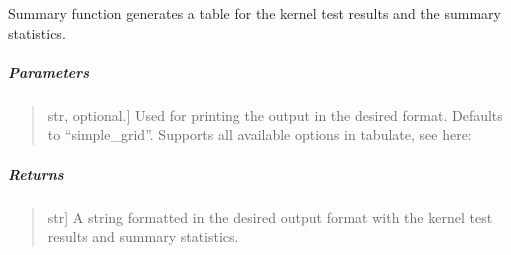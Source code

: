 \documentclass[letterpaper,10pt,english,openany,oneside]{sphinxmanual}
\begin{document}

\begin{fulllineitems}
\label{\detokenize{api_reference/generated/QuadratiK.kernel_test.KernelTest:QuadratiK.kernel_test.KernelTest.summary}}
\pysigstartsignatures
{}
\pysigstopsignatures
\sphinxAtStartPar
Summary function generates a table for the kernel test results and the summary statistics.


\subparagraph{Parameters}
\label{\detokenize{api_reference/generated/QuadratiK.kernel_test.KernelTest:id1}}\begin{quote}
\begin{description}
\sphinxlineitem{print\_fmt}{[}str, optional.{]}
\sphinxAtStartPar
Used for printing the output in the desired format. Defaults to “simple\_grid”.
Supports all available options in tabulate, see here: 

\end{description}
\end{quote}


\subparagraph{Returns}
\label{\detokenize{api_reference/generated/QuadratiK.kernel_test.KernelTest:id2}}\begin{quote}
\begin{description}
\sphinxlineitem{summary}{[}str{]}
\sphinxAtStartPar
A string formatted in the desired output 
format with the kernel test results and summary statistics.

\end{description}
\end{quote}

\end{fulllineitems}

\end{document}
